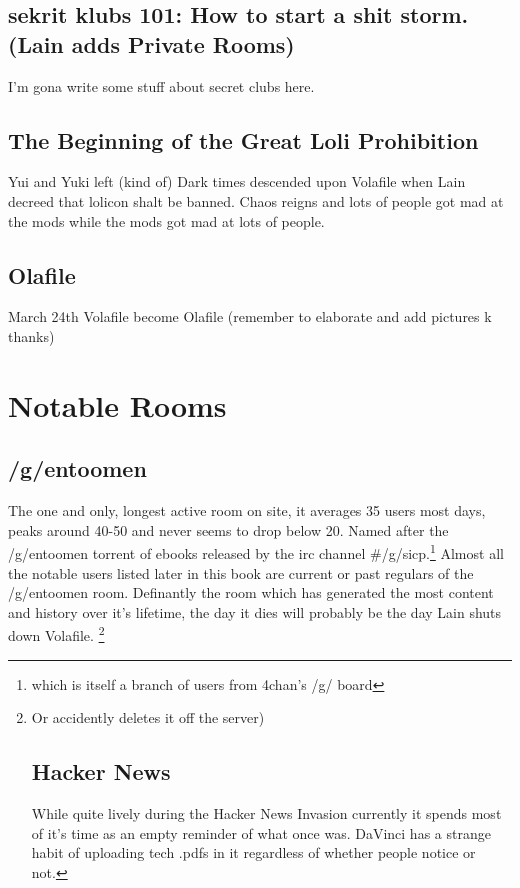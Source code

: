 \documentclass[12pt]{report}
\begin{document}
{        \section[sekrit klubs 101]{sekrit klubs 101: How to start a shit storm. (Lain adds Private Rooms)}
        I'm gona write some stuff about secret clubs here.

        \section{The Beginning of the Great Loli Prohibition}
        Yui and Yuki left (kind of) Dark times descended upon Volafile when Lain
        decreed that lolicon shalt be banned. Chaos reigns and lots of people got
        mad at the mods while the mods got mad at lots of people.

        \vfill
        \pagebreak

        \section{Olafile}
        March 24th Volafile become Olafile (remember to elaborate and add pictures k thanks)

        \chapter{Notable Rooms}

        \section{/g/entoomen}
        The one and only, longest active room on site, it averages 35 users
        most days, peaks around 40-50 and never seems to drop below 20.
        Named after the /g/entoomen torrent of ebooks released by the irc
        channel {\#}/g/sicp.\footnote{which is itself a branch of users from 4chan's /g/ board}
        Almost all the notable users listed later in this book are current
        or past regulars of the /g/entoomen room. Definantly the room which
        has generated the most content and history over it's lifetime,
        the day it dies will probably be the day Lain shuts down Volafile.
        \footnote{Or accidently deletes it off the server)

        \section{Hacker News}
        While quite lively during the Hacker News Invasion currently it
        spends most of it's time as an empty reminder of what once was.
        DaVinci has a strange habit of uploading tech .pdfs in it
        regardless of whether people notice or not.

}}
\end{document}
